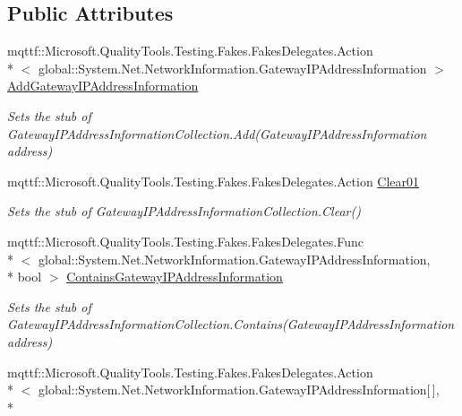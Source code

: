 \subsection*{Public Attributes}
\begin{DoxyCompactItemize}
\item 
mqttf\-::\-Microsoft.\-Quality\-Tools.\-Testing.\-Fakes.\-Fakes\-Delegates.\-Action\\*
$<$ global\-::\-System.\-Net.\-Network\-Information.\-Gateway\-I\-P\-Address\-Information $>$ \hyperlink{class_system_1_1_net_1_1_network_information_1_1_fakes_1_1_stub_gateway_i_p_address_information_collection_a5ce6bab2b820b81649a6f87ffbd3899c}{Add\-Gateway\-I\-P\-Address\-Information}
\begin{DoxyCompactList}\small\item\em Sets the stub of Gateway\-I\-P\-Address\-Information\-Collection.\-Add(\-Gateway\-I\-P\-Address\-Information address)\end{DoxyCompactList}\item 
mqttf\-::\-Microsoft.\-Quality\-Tools.\-Testing.\-Fakes.\-Fakes\-Delegates.\-Action \hyperlink{class_system_1_1_net_1_1_network_information_1_1_fakes_1_1_stub_gateway_i_p_address_information_collection_a69ed07f85f5e81770fb51f1c7b93b0ff}{Clear01}
\begin{DoxyCompactList}\small\item\em Sets the stub of Gateway\-I\-P\-Address\-Information\-Collection.\-Clear()\end{DoxyCompactList}\item 
mqttf\-::\-Microsoft.\-Quality\-Tools.\-Testing.\-Fakes.\-Fakes\-Delegates.\-Func\\*
$<$ global\-::\-System.\-Net.\-Network\-Information.\-Gateway\-I\-P\-Address\-Information, \\*
bool $>$ \hyperlink{class_system_1_1_net_1_1_network_information_1_1_fakes_1_1_stub_gateway_i_p_address_information_collection_a938fb52310a541b2fc600eb4429f5c82}{Contains\-Gateway\-I\-P\-Address\-Information}
\begin{DoxyCompactList}\small\item\em Sets the stub of Gateway\-I\-P\-Address\-Information\-Collection.\-Contains(\-Gateway\-I\-P\-Address\-Information address)\end{DoxyCompactList}\item 
mqttf\-::\-Microsoft.\-Quality\-Tools.\-Testing.\-Fakes.\-Fakes\-Delegates.\-Action\\*
$<$ global\-::\-System.\-Net.\-Network\-Information.\-Gateway\-I\-P\-Address\-Information\mbox{[}$\,$\mbox{]}, \\*

\end{DoxyCompactItemize}
